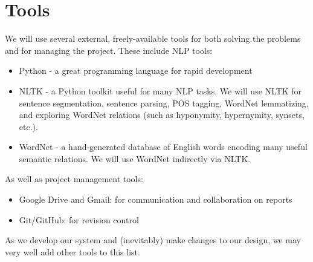 \documentclass{article}
\begin{document}
\section{Tools}
We will use several external, freely-available tools for both solving the problems and for managing the project. These include NLP tools:
\begin{itemize}
  \item Python - a great programming language for rapid development
  \item NLTK - a Python toolkit useful for many NLP tasks. We will use NLTK for sentence segmentation, sentence parsing, POS tagging, WordNet lemmatizing, and exploring WordNet relations (such as hyponymity, hypernymity, synsets, etc.).
  \item WordNet - a hand-generated database of English words encoding many useful semantic relations. We will use WordNet indirectly via NLTK.
\end{itemize}
As well as project management tools:
\begin{itemize}
  \item Google Drive and Gmail: for communication and collaboration on reports
  \item Git/GitHub: for revision control
\end{itemize}
As we develop our system and (inevitably) make changes to our design, we may very well add other tools to this list.
\end{document}
